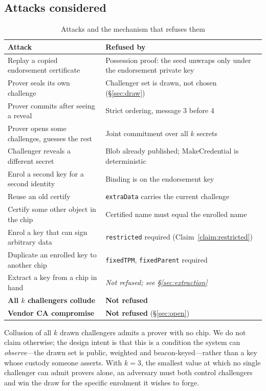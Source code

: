 \documentclass[conference,10pt]{IEEEtran}
\begin{document}
\subsection{Attacks considered}

\begin{table}[t]
\caption{Attacks and the mechanism that refuses them}
\label{tab:attacks}
\centering
\small
\begin{tabular}{@{}p{}p{}@{}}
\toprule
Attack & Refused by \\
\midrule
Replay a copied endorsement certificate & Possession proof: the seed unwraps only under the endorsement private key \\
Prover seals its own challenge & Challenger set is drawn, not chosen (\S\ref{sec:draw}) \\
Prover commits after seeing a reveal & Strict ordering, message 3 before 4 \\
Prover opens some challenges, guesses the rest & Joint commitment over all $k$ secrets \\
Challenger reveals a different secret & Blob already published; MakeCredential is deterministic \\
Enrol a second key for a second identity & Binding is on the endorsement key \\
Reuse an old certify & \texttt{extraData} carries the current challenge \\
Certify some other object in the chip & Certified name must equal the enrolled name \\
Enrol a key that can sign arbitrary data & \texttt{restricted} required (Claim~\ref{claim:restricted}) \\
Duplicate an enrolled key to another chip & \texttt{fixedTPM}, \texttt{fixedParent} required \\
Extract a key from a chip in hand & \emph{Not refused; see \S\ref{sec:extraction}} \\
\midrule
\textbf{All $k$ challengers collude} & \textbf{Not refused} \\
\textbf{Vendor CA compromise} & \textbf{Not refused} (\S\ref{sec:open}) \\
\bottomrule
\end{tabular}
\end{table}

Collusion of all $k$ drawn challengers admits a prover with no chip. We do not claim otherwise; the
design intent is that this is a condition the system can \emph{observe}---the drawn set is public,
weighted and beacon-keyed---rather than a key whose custody someone asserts. With $k=3$, the smallest
value at which no single challenger can admit provers alone, an adversary must both control challengers
and win the draw for the specific enrolment it wishes to forge.
\end{document}
